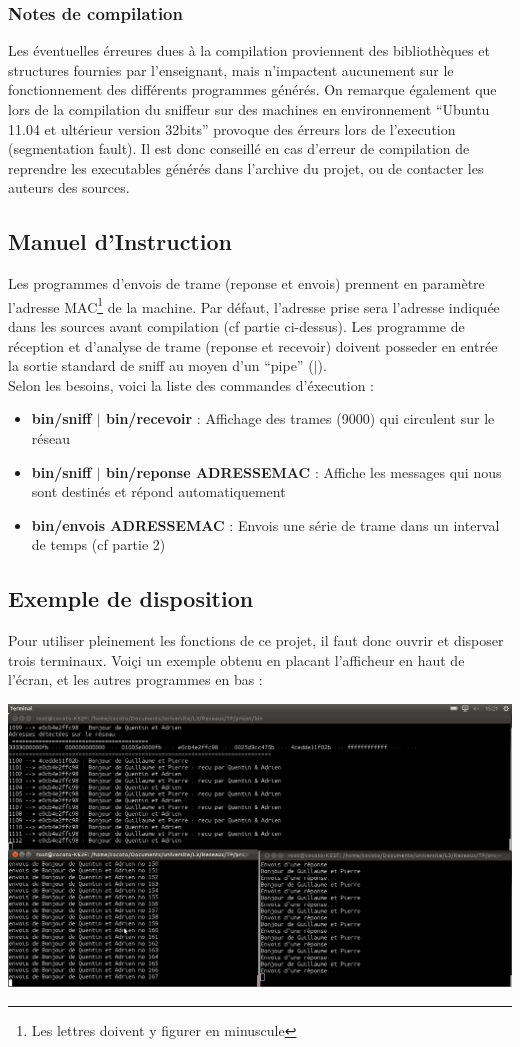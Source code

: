 \documentclass[a4paper,11pt]{article}
\begin{document}
		\subsubsection{Notes de compilation}
		Les éventuelles érreures dues à la compilation proviennent des bibliothèques et structures fournies par l'enseignant, mais n'impactent aucunement sur le fonctionnement des différents programmes générés. On remarque également que lors de la compilation du sniffeur sur des machines en environnement ``Ubuntu 11.04 et ultérieur version 32bits'' provoque des érreurs lors de l'execution (segmentation fault). Il est donc conseillé en cas d'erreur de compilation de reprendre les executables générés dans l'archive du projet, ou de contacter les auteurs des sources.
		\subsection{Manuel d'Instruction}
		Les programmes d'envois de trame (reponse et envois) prennent en paramètre l'adresse MAC\footnote{Les lettres doivent y figurer en minuscule} de la machine. Par défaut, l'adresse prise sera l'adresse indiquée dans les sources avant compilation (cf partie ci-dessus). Les programme de réception et d'analyse de trame (reponse et recevoir) doivent posseder en entrée la sortie standard de sniff au moyen d'un ``pipe'' ($|$).\\
		Selon les besoins, voici la liste des commandes d'éxecution :
		\begin{itemize}
		\item \textbf{bin/sniff $|$ bin/recevoir} : Affichage des trames (9000) qui circulent sur le réseau
		\item \textbf{bin/sniff $|$ bin/reponse ADRESSEMAC} : Affiche les messages qui nous sont destinés et répond automatiquement
		\item \textbf{bin/envois ADRESSEMAC} :		 Envois une série de trame dans un interval de temps (cf partie 2)
		\end{itemize}
		\subsection{Exemple de disposition}
		Pour utiliser pleinement les fonctions de ce projet, il faut donc ouvrir et disposer trois terminaux. Voiçi un exemple obtenu en placant l'afficheur en haut de l'écran, et les autres programmes en bas :\\
		\begin{center}\includegraphics[width=15cm]{capture_ecran_rapport.png}\end{center}
\end{document}
